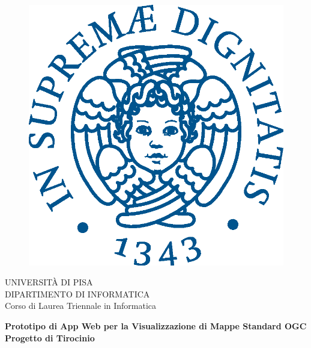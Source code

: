 \begin{titlepage}
    \begin{figure}[!htb]
        \centering
        \includegraphics[keepaspectratio=true,scale=0.5]{images/Frontespizio/cherubinFrontespizio.eps}
    \end{figure}

    \begin{center}
        \LARGE{UNIVERSITÀ DI PISA}
        \vspace{5mm}
        \\ \large{DIPARTIMENTO DI INFORMATICA }
        \vspace{5mm}
        \\ \LARGE{Corso di Laurea Triennale in Informatica}
    \end{center}

    \vspace{15mm}
    \begin{center}
        {\LARGE{\bf Prototipo di App Web per la Visualizzazione di Mappe Standard OGC\\ \vspace{5mm} Progetto di Tirocinio }}


    \end{center}
    \vspace{30mm}


\end{titlepage}
